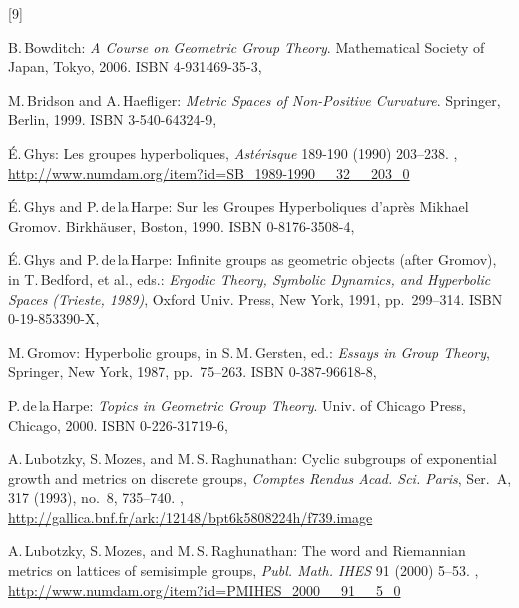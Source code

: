 \begin{references}{[9]}

B.\,Bowditch:
\emph{A Course on Geometric Group Theory}.
Mathematical Society of Japan, Tokyo, 2006.
ISBN 4-931469-35-3,

M.\,Bridson and A.\,Haefliger:
\emph{Metric Spaces of Non-Positive Curvature}.
Springer, Berlin, 1999.
ISBN 3-540-64324-9,

\'E.\,Ghys: Les groupes hyperboliques, 
\emph{Ast\'erisque} 189-190 (1990) 203--238.
,
\url{http://www.numdam.org/item?id=SB_1989-1990__32__203_0}

\'E.\,Ghys and P.\,de\,la\,Harpe:
Sur les Groupes Hyperboliques d'apr\`es Mikhael Gromov.
Birkh\"auser, Boston, 1990.
ISBN 0-8176-3508-4,

\'E.\,Ghys and P.\,de\,la\,Harpe:
Infinite groups as geometric objects (after Gromov),
in T.\,Bedford, et al., eds.:
\emph{Ergodic Theory, Symbolic Dynamics, and Hyperbolic Spaces (Trieste, 1989)}, 
Oxford Univ. Press, New York, 1991, 
pp.~299--314.
ISBN 0-19-853390-X,


M.\,Gromov:
Hyperbolic groups,
in  S.\,M.\,Gersten, ed.:
\emph{Essays in Group Theory}, 
Springer, New York, 1987, pp.~75--263.
ISBN 0-387-96618-8,

P.\,de\,la\,Harpe:
\emph{Topics in Geometric Group Theory}.
Univ. of Chicago Press, Chicago, 2000.
ISBN 0-226-31719-6,

 A.\,Lubotzky, S.\,Mozes, and M.\,S.\,Raghunathan:
 Cyclic subgroups of exponential growth and metrics on
discrete groups,
 \emph{Comptes Rendus Acad. Sci. Paris}, Ser.~A, 317
(1993), no.~8, 735--740. 
,
\maynewline
\url{http://gallica.bnf.fr/ark:/12148/bpt6k5808224h/f739.image}

A.\,Lubotzky, S.\,Mozes, and M.\,S.\,Raghunathan:
The word and Riemannian metrics on lattices of semisimple groups,
\emph{Publ. Math. IHES} 91 (2000) 5--53.
,
\url{http://www.numdam.org/item?id=PMIHES_2000__91__5_0}


\end{references}

